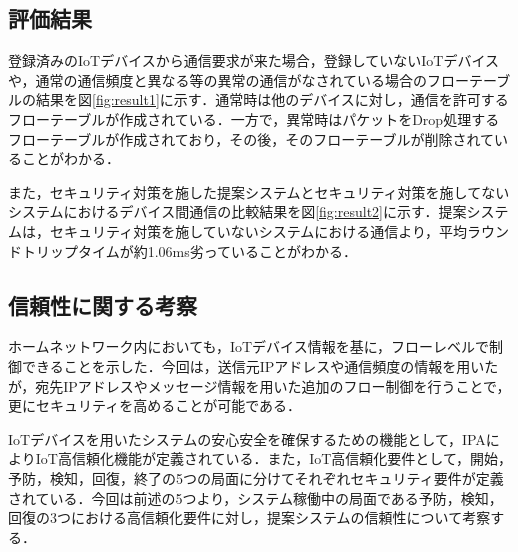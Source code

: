 \documentclass[Japanese]{dicomopapers}
\begin{document}
\subsection{評価結果}
登録済みのIoTデバイスから通信要求が来た場合，登録していないIoTデバイスや，通常の通信頻度と異なる等の異常の通信がなされている場合のフローテーブルの結果を図\ref{fig:result1}に示す．通常時は他のデバイスに対し，通信を許可するフローテーブルが作成されている．一方で，異常時はパケットをDrop処理するフローテーブルが作成されており，その後，そのフローテーブルが削除されていることがわかる．\par
また，セキュリティ対策を施した提案システムとセキュリティ対策を施してないシステムにおけるデバイス間通信の比較結果を図\ref{fig:result2}に示す．提案システムは，セキュリティ対策を施していないシステムにおける通信より，平均ラウンドトリップタイムが約1.06ms劣っていることがわかる．

\subsection{信頼性に関する考察}
ホームネットワーク内においても，IoTデバイス情報を基に，フローレベルで制御できることを示した．今回は，送信元IPアドレスや通信頻度の情報を用いたが，宛先IPアドレスやメッセージ情報を用いた追加のフロー制御を行うことで，更にセキュリティを高めることが可能である．\par
IoTデバイスを用いたシステムの安心安全を確保するための機能として，IPAによりIoT高信頼化機能が定義されている．また，IoT高信頼化要件として，開始，予防，検知，回復，終了の5つの局面に分けてそれぞれセキュリティ要件が定義されている\cite{IPA}．今回は前述の5つより，システム稼働中の局面である予防，検知，回復の3つにおける高信頼化要件に対し，提案システムの信頼性について考察する．
\end{document}

